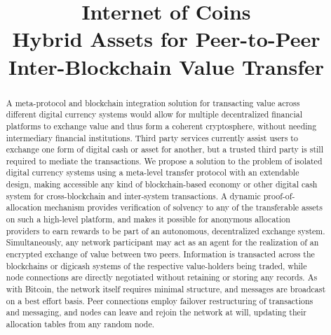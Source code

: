 \documentclass[a4paper]{article}
\title{Internet of Coins\\[6mm]
\small{Hybrid Assets for Peer-to-Peer Inter-Blockchain Value Transfer}
}
\begin{document}
\maketitle

\newcommand{\hybridd}{\texttt{hybridd}\, }
\newcommand{\stormwind}{\texttt{STORMWIND}\, }


\begin{abstract}
 A meta-protocol and blockchain integration solution for transacting value across different digital currency systems would allow for multiple decentralized financial platforms to exchange value and thus form a coherent cryptosphere, without needing intermediary financial institutions. Third party services currently assist users to exchange one form of digital cash or asset for another, but a trusted third party is still required to mediate the transactions. We propose a solution to the problem of isolated digital currency systems using a meta-level transfer protocol with an extendable design, making accessible any kind of blockchain-based economy or other digital cash system for cross-blockchain and inter-system transactions. A dynamic proof-of-allocation mechanism provides verification of solvency to any of the transferable assets on such a high-level platform, and makes it possible for anonymous allocation providers to earn rewards to be part of an autonomous, decentralized exchange system. Simultaneously, any network participant may act as an agent for the realization of an encrypted exchange of value between two peers. Information is transacted across the blockchains or digicash systems of the respective value-holders being traded, while node connections are directly negotiated without retaining or storing any records. As with Bitcoin, the network itself requires minimal structure, and messages are broadcast on a best effort basis. Peer connections employ failover restructuring of transactions and messaging, and nodes can leave and rejoin the network at will, updating their allocation tables from any random node.
\end{abstract}
\end{document}
